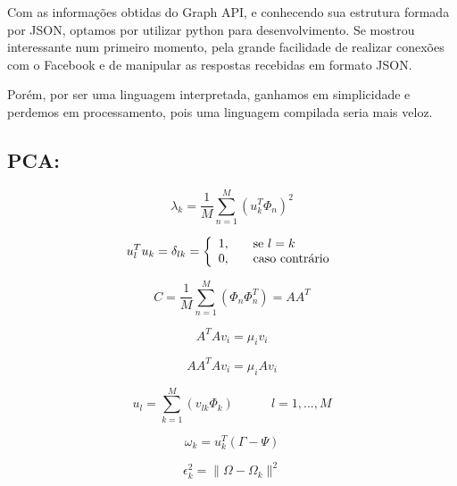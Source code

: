 \documentclass[10pt,a4paper]{article}
\begin{document}
	Com as informações obtidas do Graph API, e conhecendo sua estrutura formada por JSON, optamos por utilizar python para desenvolvimento. Se mostrou interessante num primeiro momento, pela grande facilidade de realizar conexões com o Facebook e de manipular as respostas recebidas em formato JSON.

	Porém, por ser uma linguagem interpretada, ganhamos em simplicidade e perdemos em processamento, pois uma linguagem compilada seria mais veloz.


\subsection*{PCA:}

\begin{equation}
\lambda_{k}=\frac{1}{M}\sum_{n=1}^{M}(u_k^T\Phi_n)^2
\end{equation}


\begin{equation}
u_l^Tu_k=\delta_{lk}=\left \{
  \begin{array}{l l}
    1, & \quad \text{se $l=k$} \\
    0, & \quad \text{caso contrário}\\
  \end{array}
\right.
\end{equation}



\begin{equation}
C=\frac{1}{M}\sum_{n=1}^{M}(\Phi_n\Phi_n^T)= AA^T
\end{equation}


\begin{equation}
A^TAv_i=\mu_iv_i
\end{equation}



\begin{equation}
AA^TAv_i=\mu_iAv_i
\end{equation}



\begin{equation}
u_l=\sum_{k=1}^{M}(v_{lk}\Phi_k) \quad\quad\quad l = 1,...,M
\end{equation}


\begin{equation}
\omega_k=u_k^T(\Gamma-\Psi)
\end{equation}



\begin{equation}
\epsilon_k^2=\|\Omega-\Omega_k\|^2
\end{equation}
\end{document}
